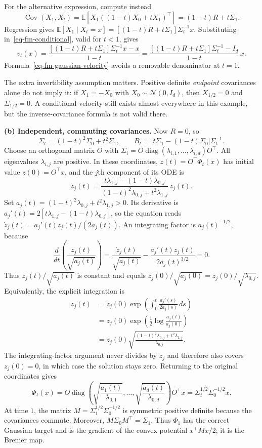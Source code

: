 \documentclass[11pt,a4paper]{article}
\theoremstyle{exostyle}
\newcommand{\EE}{\mathbb{E}}
\newcommand{\Cov}{\operatorname{Cov}}
\newcommand{\Gauss}{\mathcal{N}}
\begin{document}
\begin{solution}
For the alternative expression, compute instead
\[
  \Cov(X_1,X_t)
     =\EE[X_1((1-t)X_0+tX_1)^\top]
     =(1-t)R+t\Sigma_1.
\]
Regression gives
$\EE[X_1\mid X_t=x]=[(1-t)R+t\Sigma_1]\Sigma_t^{-1}x$.
Substituting in~\eqref{eq-fm-conditional}, valid for $t<1$, gives
\[
  v_t(x)
    =\frac{[(1-t)R+t\Sigma_1]\Sigma_t^{-1}x-x}{1-t}
    =\frac{[(1-t)R+t\Sigma_1]\Sigma_t^{-1}-I_d}{1-t}\,x.
\]
Formula~\eqref{eq-fm-gaussian-velocity} avoids a removable denominator
at $t=1$.

The extra invertibility assumption matters. Positive definite
\emph{endpoint} covariances alone do not imply it: if $X_1=-X_0$
with $X_0\sim\Gauss(0,I_d)$, then $X_{1/2}=0$ and
$\Sigma_{1/2}=0$. A conditional velocity still exists almost everywhere
in this example, but the inverse-covariance formula is not valid there.

\textbf{(b) Independent, commuting covariances.}
Now $R=0$, so
\[
  \Sigma_t=(1-t)^2\Sigma_0+t^2\Sigma_1,\qquad
  B_t=\big[t\Sigma_1-(1-t)\Sigma_0\big]\Sigma_t^{-1}.
\]
Choose an orthogonal matrix $O$ with
$\Sigma_i=O\operatorname{diag}(\lambda_{i,1},\ldots,\lambda_{i,d})O^\top$.
All eigenvalues $\lambda_{i,j}$ are positive. In these coordinates,
$z(t)=O^\top\Phi_t(x)$ has initial value $z(0)=O^\top x$, and the
$j$th component of its ODE is
\[
  \dot z_j(t)=
  \frac{t\lambda_{1,j}-(1-t)\lambda_{0,j}}
       {(1-t)^2\lambda_{0,j}+t^2\lambda_{1,j}}\,z_j(t).
\]
Set $a_j(t)=(1-t)^2\lambda_{0,j}+t^2\lambda_{1,j}>0$. Its derivative is
$a_j'(t)=2[t\lambda_{1,j}-(1-t)\lambda_{0,j}]$, so the equation reads
$\dot z_j(t)=a_j'(t)z_j(t)/(2a_j(t))$.
An integrating factor is $a_j(t)^{-1/2}$, because
\[
  \frac{d}{dt}\left(\frac{z_j(t)}{\sqrt{a_j(t)}}\right)
    =\frac{\dot z_j(t)}{\sqrt{a_j(t)}}
       -\frac{a_j'(t)z_j(t)}{2a_j(t)^{3/2}}=0.
\]
Thus $z_j(t)/\sqrt{a_j(t)}$ is constant and equals
$z_j(0)/\sqrt{a_j(0)}=z_j(0)/\sqrt{\lambda_{0,j}}$.
Equivalently, the explicit integration is
\begin{align*}
  z_j(t)
    &=z_j(0)\exp\left(\int_0^t\frac{a_j'(s)}{2a_j(s)}\,ds\right)\\
    &=z_j(0)\exp\left(\frac12\log\frac{a_j(t)}{a_j(0)}\right)\\
    &=z_j(0)\sqrt{\frac{(1-t)^2\lambda_{0,j}+t^2\lambda_{1,j}}
                             {\lambda_{0,j}}}.
\end{align*}
The integrating-factor argument never divides by $z_j$ and therefore
also covers $z_j(0)=0$, in which case the solution stays zero.
Returning to the original coordinates gives
\[
  \Phi_t(x)
    =O\operatorname{diag}\left(\sqrt{\frac{a_1(t)}{\lambda_{0,1}}},
                    \ldots,\sqrt{\frac{a_d(t)}{\lambda_{0,d}}}\right)O^\top x
    =\Sigma_t^{1/2}\Sigma_0^{-1/2}x.
\]
At time $1$, the matrix $M=\Sigma_1^{1/2}\Sigma_0^{-1/2}$ is symmetric
positive definite because the covariances commute. Moreover,
$M\Sigma_0M^\top=\Sigma_1$. Thus $\Phi_1$ has the correct Gaussian
target and is the gradient of the convex potential $x^\top Mx/2$;
it is the Brenier map.


\end{solution}
\end{document}
